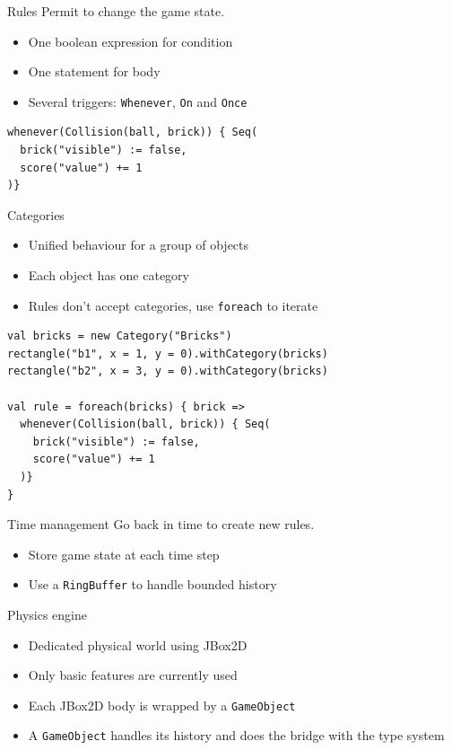 \documentclass[12pt]{beamer}
\begin{document}
\begin{frame}[fragile]{Rules}
Permit to change the game state.
\begin{itemize}
\item One boolean expression for condition
\item One statement for body
\item Several triggers: \texttt{Whenever}, \texttt{On} and \texttt{Once}
\end{itemize}

\vspace*{5mm}

\begin{lstlisting}
whenever(Collision(ball, brick)) { Seq(
  brick("visible") := false, 
  score("value") += 1
)}
\end{lstlisting}
\end{frame}

\begin{frame}[fragile]{Categories}

\begin{itemize}
\item Unified behaviour for a group of objects
\item Each object has one category
\item Rules don't accept categories, use \texttt{foreach} to iterate
\end{itemize}

\begin{lstlisting}
val bricks = new Category("Bricks")
rectangle("b1", x = 1, y = 0).withCategory(bricks)
rectangle("b2", x = 3, y = 0).withCategory(bricks)

val rule = foreach(bricks) { brick =>
  whenever(Collision(ball, brick)) { Seq(
    brick("visible") := false,
    score("value") += 1
  )}
}
\end{lstlisting}
\end{frame}

\begin{frame}{Time management}
Go back in time to create new rules.
\begin{itemize}
\item Store game state at each time step
\item Use a \texttt{RingBuffer} to handle bounded history
\end{itemize}
\end{frame}

\begin{frame}{Physics engine}
\begin{itemize}
\item Dedicated physical world using JBox2D
\item Only basic features are currently used
\item Each JBox2D body is wrapped by a \texttt{GameObject}
\item A \texttt{GameObject} handles its history and does the bridge with the type system
\end{itemize}
\end{frame}
\end{document}
